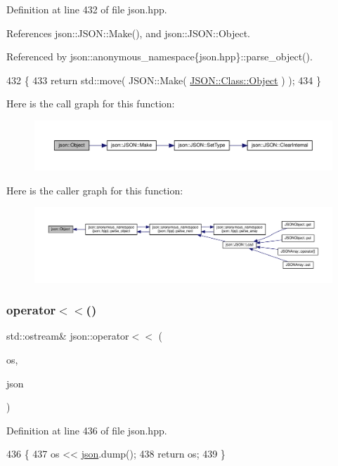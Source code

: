 Definition at line 432 of file json.\+hpp.



References json\+::\+J\+S\+O\+N\+::\+Make(), and json\+::\+J\+S\+O\+N\+::\+Object.



Referenced by json\+::anonymous\+\_\+namespace\{json.\+hpp\}\+::parse\+\_\+object().


\begin{DoxyCode}
432                      \{
433     \textcolor{keywordflow}{return} std::move( JSON::Make( \mbox{\hyperlink{namespacejson_a7bc7d25f21c18a652a42db29cfdabd06}{JSON::Class::Object}} ) );
434 \}
\end{DoxyCode}
Here is the call graph for this function\+:
\nopagebreak
\begin{figure}[H]
\begin{center}
\leavevmode
\includegraphics[width=350pt]{namespacejson_a7bc7d25f21c18a652a42db29cfdabd06_cgraph}
\end{center}
\end{figure}
Here is the caller graph for this function\+:
\nopagebreak
\begin{figure}[H]
\begin{center}
\leavevmode
\includegraphics[width=350pt]{namespacejson_a7bc7d25f21c18a652a42db29cfdabd06_icgraph}
\end{center}
\end{figure}
\mbox{\label{namespacejson_a348c2e5bffbeca243a52de2977e71b08}} 
\subsubsection{\texorpdfstring{operator$<$$<$()}{operator<<()}}
{\footnotesize\ttfamily std\+::ostream\& json\+::operator$<$$<$ (\begin{DoxyParamCaption}\item[{std\+::ostream \&}]{os,  }\item[{const \mbox{\hyperlink{classjson_1_1_j_s_o_n}{J\+S\+ON}} \&}]{json }\end{DoxyParamCaption})\hspace{0.3cm}{\ttfamily [inline]}}



Definition at line 436 of file json.\+hpp.


\begin{DoxyCode}
436                                                                   \{
437     os << \mbox{\hyperlink{namespacejson}{json}}.dump();
438     \textcolor{keywordflow}{return} os;
439 \}
\end{DoxyCode}
